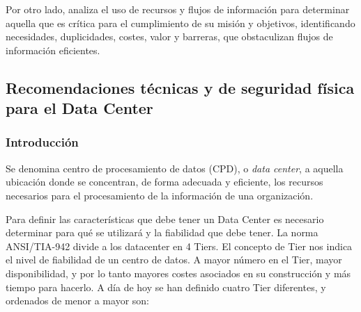     Por otro lado, analiza el uso de recursos y flujos de información para determinar aquella que es crítica para el cumplimiento de su misión y objetivos, identificando necesidades, duplicidades, costes, valor y barreras, que obstaculizan flujos de información eficientes.
    
    
    \newpage
    
    \subsection{Recomendaciones técnicas y de seguridad física para el Data Center}
    
    \subsubsection{Introducción}
    Se denomina centro de procesamiento de datos (CPD), o \textit{data center}, a aquella ubicación donde se concentran, de forma adecuada y eficiente, los recursos necesarios para el procesamiento de la información de una organización.
    
    Para definir las características que debe tener un Data Center es necesario determinar para qué se utilizará y la fiabilidad que debe tener. La norma  ANSI/TIA-942 divide a los datacenter en 4 Tiers. El concepto de Tier nos indica el nivel de fiabilidad de un centro de datos. A mayor número en el Tier, mayor disponibilidad, y por lo tanto mayores costes asociados en su construcción y más tiempo para hacerlo. A día de hoy se han definido cuatro Tier diferentes, y ordenados de menor a mayor son:
    
